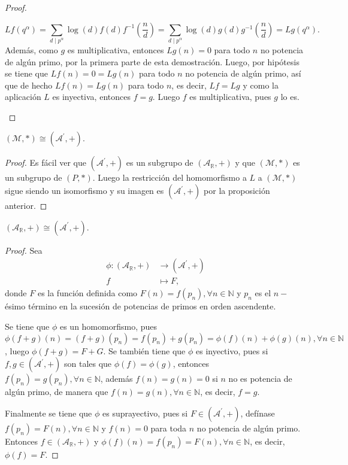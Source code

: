 \begin{proof}
\begin{enumerate}[label=\textnormal{(\arabic*)},ref=\textnormal{\arabic*}]
\begin{equation*}
            Lf(q^\alpha) = \sum_{d \mid p^\alpha} \log(d) f(d)f^{-1}\left( \frac{n}{d} \right) = \sum_{d \mid p^\alpha} \log(d) g(d)g^{-1}\left( \frac{n}{d} \right) = Lg(q^\alpha).
        \end{equation*}
        Además, como $g$ es multiplicativa, entonces $Lg(n)=0$ para todo $n$ no potencia de algún primo, por la primera parte de esta demostración. Luego, por hipótesis se tiene que $Lf(n)=0=Lg(n)$ para todo $n$ no potencia de algún primo, así que de hecho $Lf(n)=Lg(n)$ para todo $n$, es decir, $Lf=Lg$ y como la aplicación $L$ es inyectiva, entonces $f=g$. Luego $f$ es multiplicativa, pues $g$ lo es.
\end{enumerate}
\end{proof}

\begin{lemma}\label{prop:iso2}
$(\mathcal{M},*) \cong (\mathcal{A}^\prime,+)$.
\end{lemma}
\begin{proof}
Es fácil ver que $(\mathcal{A}^\prime,+)$ es un subgrupo de $(\mathcal{A}_{\mathbb{R}},+)$ y que $(\mathcal{M},*)$ es un subgrupo de $(P,*)$. Luego la restricción del homomorfismo a $L$ a $(\mathcal{M},*)$ sigue siendo un isomorfismo y su imagen es $(\mathcal{A}^\prime,+)$ por la proposición anterior.
\end{proof}

\begin{lemma}\label{prop:iso3}
$(\mathcal{A}_{\mathbb{R}},+) \cong (\mathcal{A}^\prime,+)$.
\end{lemma}
\begin{proof}
Sea
\begin{align*}
    \phi : (\mathcal{A}_{\mathbb{R}},+) & \longrightarrow (\mathcal{A}^\prime,+) \\
    f & \longmapsto F,
\end{align*}
donde $F$ es la función definida como $F(n)=f(p_n), \forall n \in \mathbb{N}$ y $p_n$ es el $n-$ésimo término en la sucesión de potencias de primos en orden ascendente.
\bigskip

Se tiene que $\phi$ es un homomorfismo, pues $\phi(f+g)(n)=(f+g)(p_n)=f(p_n)+g(p_n)=\phi(f)(n)+\phi(g)(n), \forall n \in \mathbb{N}$, luego $\phi(f+g)=F+G$. Se también tiene que $\phi$ es inyectivo, pues si $f,g \in (\mathcal{A}^\prime,+)$ son tales que $\phi(f)=\phi(g)$, entonces $f(p_n)=g(p_n), \forall n \in \mathbb{N}$, además $f(n)=g(n)=0$ si $n$ no es potencia de algún primo, de manera que $f(n)=g(n), \forall n \in \mathbb{N}$, es decir, $f=g$.
\bigskip

Finalmente se tiene que $\phi$ es suprayectivo, pues si $F \in (\mathcal{A}^\prime,+)$, defínase $f(p_n)=F(n), \forall n \in \mathbb{N}$ y $f(n)=0$ para toda $n$ no potencia de algún primo. Entonces $f \in (\mathcal{A}_{\mathbb{R}},+)$ y $\phi(f)(n)=f(p_n)=F(n), \forall n \in \mathbb{N}$, es decir, $\phi(f)=F$.
\end{proof}

